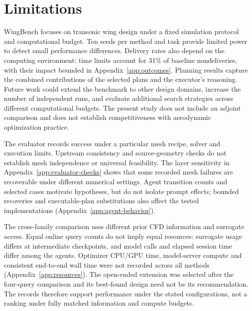 \section{Limitations}
\label{app:limitations}

WingBench focuses on transonic wing design under a fixed simulation protocol
and computational budget. Ten seeds per method and task provide limited power
to detect small performance differences. Delivery rates also depend on the
computing environment: time limits account for 31\% of baseline nondeliveries,
with their impact bounded in Appendix~\ref{app:outcomes}. Planning results
capture the combined contributions of the selected plans and the executor's
reasoning. Future work could extend the benchmark to other design domains,
increase the number of independent runs, and evaluate additional search
strategies across different computational budgets. The present study does not
include an adjoint comparison and does not establish competitiveness with
aerodynamic optimization practice.

The evaluator records success under a particular mesh recipe, solver and
execution limits. Upstream consistency and source-geometry checks do not
establish mesh independence or universal feasibility. The layer sensitivity
in Appendix~\ref{app:evaluator-checks} shows that some recorded mesh failures
are recoverable under different numerical settings. Agent transition counts
and selected cases motivate hypotheses, but do not isolate prompt effects;
bounded recoveries and executable-plan substitutions also affect the tested
implementations (Appendix~\ref{app:agent-behavior}).

The cross-family comparison uses different prior CFD information and surrogate
access. Equal online query counts do not imply equal resources: surrogate
usage differs at intermediate checkpoints, and model calls and elapsed session
time differ among the agents. Optimizer CPU/GPU time, model-server compute and
consistent end-to-end wall time were not recorded across all methods
(Appendix~\ref{app:resources}). The open-ended extension was selected after the
four-query comparison and its best-found design need not be its recommendation.
The records therefore support performance under the stated configurations,
not a ranking under fully matched information and compute budgets.
